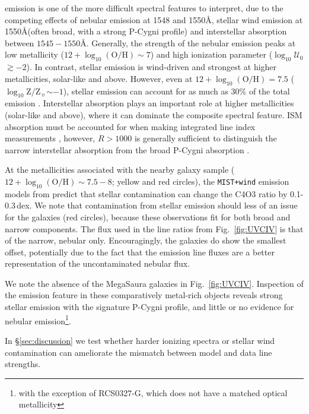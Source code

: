 \documentclass[preprint2]{aastex62}
\newcommand{\logten}{\ensuremath{\log_{10}}}
\newcommand{\logZ}{\ensuremath{\logten \mathrm{Z}/\mathrm{Z}_{\sun}}\xspace}
\newcommand{\logOH}{\ensuremath{\logten (\mathrm{O}/\mathrm{H})}\xspace}
\newcommand{\ang}{\ensuremath{\mbox{\AA}}\xspace}
\newcommand{\logU}{\ensuremath{\logten \mathcal{U}_0}}
\newcommand{\mage}{{\sc Meg}a{\sc S}a{\sc ura}\xspace}
\begin{document}
 emission is one of the more difficult spectral features to interpret, due to the competing effects of nebular emission at 1548 and 1550\ang, stellar wind emission at 1550\ang (often broad, with a strong P-Cygni profile) and interstellar absorption between $1545-1550$\ang. Generally, the strength of the nebular  emission peaks at low metallicity ($12+\logOH \sim 7$) and high ionization parameter (\logU$\gtrsim-2$). In contrast, stellar emission is wind-driven and strongest at higher metallicities, solar-like and above. However, even at $12+\logOH = 7.5$ (\logZ${\sim}-1$), stellar  emission can account for as much as 30\% of the total  emission . Interstellar absorption plays an important role at higher metallicities (solar-like and above), where it can dominate the composite  spectral feature. ISM absorption must be accounted for when making integrated line index measurements \citep[e.g.,][]{Vidal-Garcia+2017}, however, $R>1000$ is generally sufficient to distinguish the narrow interstellar absorption from the broad P-Cygni absorption \citep[e.g.,][]{Crowther+2006, Chisholm+2019}.

At the metallicities associated with the nearby galaxy sample ($12+\logOH \sim 7.5-8$; yellow and red circles), the {\tt MIST+wind}  emission models from  predict that stellar contamination can change the C4O3 ratio by 0.1-0.3\,dex. We note that contamination from stellar emission should less of an issue for the \citet{Senchyna+2017} galaxies (red circles), because these observations fit for both broad and narrow  components. The  flux used in the line ratios from Fig.~\ref{fig:UVCIV} is that of the narrow, nebular  only. Encouragingly, the \citet{Senchyna+2017} galaxies do show the smallest offset, potentially due to the fact that the  emission line fluxes are a better representation of the uncontaminated nebular flux.

We note the absence of the \mage galaxies in Fig.~\ref{fig:UVCIV}. Inspection of the  emission feature in these comparatively metal-rich objects reveals strong stellar emission with the signature P-Cygni profile, and little or no evidence for nebular emission\footnote{with the exception of RCS0327-G, which does not have a matched optical metallicity}\citep{Chisholm+2019}.

In \S\ref{sec:discussion} we test whether harder ionizing spectra or stellar wind contamination can ameliorate the mismatch between model and data  line strengths.
\end{document}
